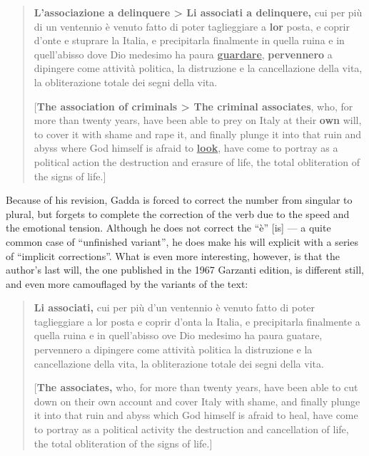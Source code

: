 \documentclass{article}
\begin{document}
\begin{quote}
\textbf{L'associazione a delinquere \textgreater{} Li associati a
delinquere,} cui per più di un ventennio è venuto fatto di poter
taglieggiare a \textbf{lor} posta, e coprir d'onte e stuprare la Italia,
e precipitarla finalmente in quella ruina e in quell'abisso dove Dio
medesimo ha paura \textbf{\uline{guardare}}, \textbf{pervennero} a
dipingere come attività politica, la distruzione e la cancellazione
della vita, la obliterazione totale dei segni della vita.

\vspace{1em}

[\textbf{The association of criminals \textgreater{} The criminal
associates}, who, for more than twenty years, have been able to prey on
Italy at their \textbf{own} will, to cover it with shame and rape it,
and finally plunge it into that ruin and abyss where God himself is
afraid to \textbf{\uline{look}}, have come to portray as a political action the
destruction and erasure of life, the total obliteration of the signs of
life.]

\begin{flushright}
\parencite[11]{gadda_eros_2016}
\end{flushright}

\end{quote}


Because of his revision, Gadda is forced to correct the number from singular to plural, but forgets to complete the
correction of the verb due to the speed and the emotional tension. Although he does not correct the ``è'' [is] –– a quite common case
of ``unfinished variant'', he does make his will explicit with a series of ``implicit corrections''. What is even more interesting, however, is that the author's last will, the
one published in the 1967 Garzanti edition, is different still, and even more camouflaged by the variants of the text:

\begin{quote}
\textbf{Li associati,} cui per più d'un ventennio è venuto fatto di
poter taglieggiare a lor posta e coprir d'onta la Italia, e precipitarla
finalmente a quella ruina e in quell'abisso ove Dio medesimo ha paura
guatare, pervennero a dipingere come attività politica la distruzione e
la cancellazione della vita, la obliterazione totale dei segni della
vita.

\vspace{1em}

[\textbf{The associates,} who, for more than twenty years, have been able
to cut down on their own account and cover Italy with shame, and finally
plunge it into that ruin and abyss which God himself is afraid to heal,
have come to portray as a political activity the destruction and
cancellation of life, the total obliteration of the signs of
life.]
\begin{flushright}
\parencite[21]{gadda_eros_2004}
\end{flushright}
\end{quote}
\end{document}
